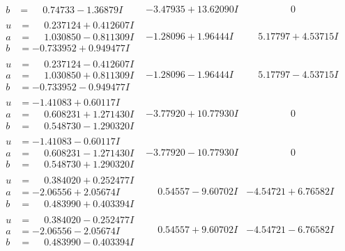 \documentclass[1p]{elsarticle_modified}
\theoremstyle{definition}
\begin{document}
$$\begin{array}{c|c|c}
\begin{aligned}
b &= \phantom{-}0.74733 - 1.36879 I\end{aligned}
 & -3.47935 + 13.62090 I & \phantom{-0.000000 } 0 \\ \hline\begin{aligned}
u &= \phantom{-}0.237124 + 0.412607 I \\
a &= \phantom{-}1.030850 - 0.811309 I \\
b &= -0.733952 + 0.949477 I\end{aligned}
 & -1.28096 + 1.96444 I & \phantom{-}5.17797 + 4.53715 I \\ \hline\begin{aligned}
u &= \phantom{-}0.237124 - 0.412607 I \\
a &= \phantom{-}1.030850 + 0.811309 I \\
b &= -0.733952 - 0.949477 I\end{aligned}
 & -1.28096 - 1.96444 I & \phantom{-}5.17797 - 4.53715 I \\ \hline\begin{aligned}
u &= -1.41083 + 0.60117 I \\
a &= \phantom{-}0.608231 + 1.271430 I \\
b &= \phantom{-}0.548730 - 1.290320 I\end{aligned}
 & -3.77920 + 10.77930 I & \phantom{-0.000000 } 0 \\ \hline\begin{aligned}
u &= -1.41083 - 0.60117 I \\
a &= \phantom{-}0.608231 - 1.271430 I \\
b &= \phantom{-}0.548730 + 1.290320 I\end{aligned}
 & -3.77920 - 10.77930 I & \phantom{-0.000000 } 0 \\ \hline\begin{aligned}
u &= \phantom{-}0.384020 + 0.252477 I \\
a &= -2.06556 + 2.05674 I \\
b &= \phantom{-}0.483990 + 0.403394 I\end{aligned}
 & \phantom{-}0.54557 - 9.60702 I & -4.54721 + 6.76582 I \\ \hline\begin{aligned}
u &= \phantom{-}0.384020 - 0.252477 I \\
a &= -2.06556 - 2.05674 I \\
b &= \phantom{-}0.483990 - 0.403394 I\end{aligned}
 & \phantom{-}0.54557 + 9.60702 I & -4.54721 - 6.76582 I \\ \hline\begin{aligned}

\end{aligned}
\end{array}$$
\end{document}
